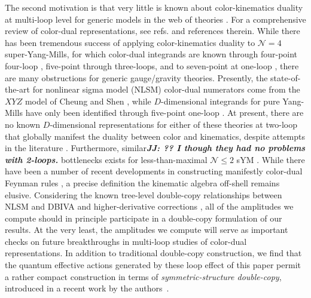 \documentclass[12pt,letter]{article}
\def\dj#1{{\color{NUpurple}\it \bf JJ: #1}}
\begin{document}
The second motivation is that very little is known about color-kinematics duality at multi-loop level for generic models in the web of theories \cite{BCJreview}. For a comprehensive review of color-dual representations, see refs. \cite{BCJreview, Bern:2022wqg, Adamo:2022dcm} and references therein. While there has been tremendous success of applying color-kinematics duality to $\mathcal{N}=4$ super-Yang-Mills, for which color-dual integrands are known through four-point four-loop \cite{Bern:2012uf, Neq44np, GravityFour}, five-point through three-loops, and to seven-point at one-loop \cite{Bjerrum-Bohr:2013iza,Edison:2020uzf,Edison:2022jln}, there are many obstructions for generic gauge/gravity theories. Presently, the state-of-the-art for nonlinear sigma model (NLSM) color-dual numerators come from the $XY\!Z$ model of Cheung and Shen \cite{Cheung2016prv}, while $D$-dimensional integrands for pure Yang-Mills have only been identified through five-point one-loop \cite{He:2017spx}. At present, there are no known $D$-dimensional representations for either of these theories at two-loop that globally manifest the duality between color and kinematics, despite attempts in the literature \cite{OneTwoLoopPureYMBCJ, Mogull:2015adi, Bern:2015ooa, Geyer:2019hnn}. Furthermore, similar\dj{?? I though they had no problems with 2-loops.} bottlenecks exists for less-than-maximal $\mathcal{N}\leq 2$ sYM \cite{Johansson:2017bfl}. While there have been a number of recent developments in constructing manifestly color-dual Feynman rules \cite{Chen:2019ywi,Chen:2021chy,Brandhuber:2021bsf,Cheung:2021zvb,Ben-Shahar:2021zww,Cheung:2022mix, Ben-Shahar:2022ixa}, a precise definition the kinematic algebra off-shell remains elusive. Considering the known tree-level double-copy relationships between NLSM and DBIVA and higher-derivative corrections \cite{Cachazo:2014xea,Carrasco:2016ldy}, all of the amplitudes we compute should in principle participate in a double-copy formulation of our results. At the very least, the amplitudes we compute will serve as important checks on future breakthroughs in multi-loop studies of color-dual representations. In addition to traditional double-copy construction, we find that the quantum effective actions generated by these loop effect of this paper permit a rather compact construction in terms of \textit{symmetric-structure double-copy}, introduced in a recent work by the authors~\cite{Carrasco:2022jxn}. 
\end{document}
